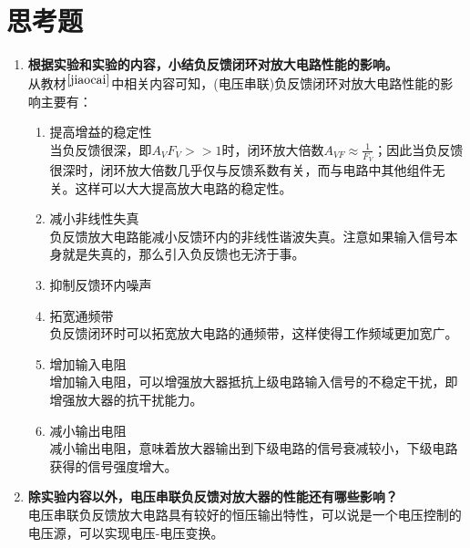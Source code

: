 \documentclass[a4paper]{article}
\begin{document}
\section{思考题}
\begin{enumerate}
\item \textbf{根据实验和实验的内容，小结负反馈闭环对放大电路性能的影响。}\\
从教材$^{\cite{jiaocai}}$中相关内容可知，(电压串联)负反馈闭环对放大电路性能的影响主要有：
\begin{enumerate}
\item 提高增益的稳定性\\
当负反馈很深，即$A_VF_V>>1$时，闭环放大倍数$A_{VF} \approx \frac{1}{F_V}$；因此当负反馈很深时，闭环放大倍数几乎仅与反馈系数有关，而与电路中其他组件无关。这样可以大大提高放大电路的稳定性。
\item 减小非线性失真\\
负反馈放大电路能减小反馈环内的非线性谐波失真。注意如果输入信号本身就是失真的，那么引入负反馈也无济于事。
\item 抑制反馈环内噪声
\item 拓宽通频带\\
负反馈闭环时可以拓宽放大电路的通频带，这样使得工作频域更加宽广。
\item 增加输入电阻\\
增加输入电阻，可以增强放大器抵抗上级电路输入信号的不稳定干扰，即增强放大器的抗干扰能力。
\item 减小输出电阻\\
减小输出电阻，意味着放大器输出到下级电路的信号衰减较小，下级电路获得的信号强度增大。
\end{enumerate}
\item \textbf{除实验内容以外，电压串联负反馈对放大器的性能还有哪些影响？}\\
电压串联负反馈放大电路具有较好的恒压输出特性，可以说是一个电压控制的电压源，可以实现电压-电压变换。
\end{enumerate}

\end{document}
